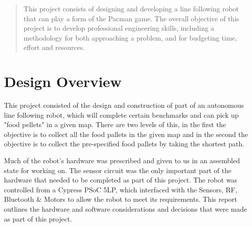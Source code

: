 \documentclass{article}
\begin{document}
\newpage

\maketitle


\begin{abstract}

This project consists of designing and developing a line following robot that can play a form of the Pacman game. The overall objective of this project is to develop professional engineering skills, including a methodology for both approaching a problem, and for budgeting time, effort and resources. 
\end{abstract}


\section{Design Overview}

This project consisted of the design and construction of part of an autonomous line following robot, which will complete certain benchmarks and can pick up "food pellets" in a given map. There are two levels of this, in the first the objective is to collect all the food pallets in the given map and in the second the objective is to collect the pre-specified food pallets by taking the shortest path.

Much of the robot's hardware was prescribed and given to us in an assembled state for working on. The sensor circuit was the only important part of the hardware that needed to be completed as part of this project. The robot was controlled from a Cypress PSoC 5LP, which interfaced with the Sensors, RF, Bluetooth \&  Motors to allow the robot to meet its requirements. This report outlines the hardware and software considerations and decisions that were made as part of this project.

\end{document}
